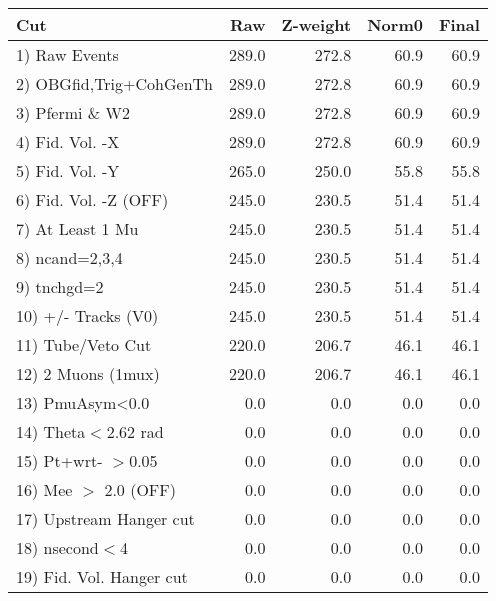  \begin{table}[h!]\centering
 \begin{tabular}{||l||r|r|r|r||}
 \hline
 \hline
 Cut & Raw & Z-weight & Norm0 & Final \\
 \hline
  1) Raw Events           &       289.0 &       272.8 &        60.9 &        60.9 \\
  2) OBGfid,Trig+CohGenTh &       289.0 &       272.8 &        60.9 &        60.9 \\
  3) Pfermi \& W2         &       289.0 &       272.8 &        60.9 &        60.9 \\
  4) Fid. Vol. -X         &       289.0 &       272.8 &        60.9 &        60.9 \\
  5) Fid. Vol. -Y         &       265.0 &       250.0 &        55.8 &        55.8 \\
  6) Fid. Vol. -Z (OFF)   &       245.0 &       230.5 &        51.4 &        51.4 \\
  7) At Least 1 Mu        &       245.0 &       230.5 &        51.4 &        51.4 \\
  8) ncand=2,3,4          &       245.0 &       230.5 &        51.4 &        51.4 \\
  9) tnchgd=2             &       245.0 &       230.5 &        51.4 &        51.4 \\
 10) +/- Tracks (V0)      &       245.0 &       230.5 &        51.4 &        51.4 \\
 11) Tube/Veto Cut        &       220.0 &       206.7 &        46.1 &        46.1 \\
 12) 2 Muons (1mux)       &       220.0 &       206.7 &        46.1 &        46.1 \\
 13) PmuAsym<0.0          &         0.0 &         0.0 &         0.0 &         0.0 \\
 14) Theta$<$2.62 rad     &         0.0 &         0.0 &         0.0 &         0.0 \\
 15) Pt+wrt- $>$0.05      &         0.0 &         0.0 &         0.0 &         0.0 \\
 16) Mee $>$ 2.0  (OFF)   &         0.0 &         0.0 &         0.0 &         0.0 \\
 17) Upstream Hanger cut  &         0.0 &         0.0 &         0.0 &         0.0 \\
 18) nsecond$<$4          &         0.0 &         0.0 &         0.0 &         0.0 \\
 19) Fid. Vol. Hanger cut &         0.0 &         0.0 &         0.0 &         0.0 \\

\end{tabular}
\end{table}
